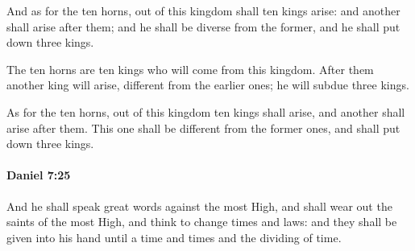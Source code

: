 			\begin{versebox}
					\item[BHS] 
					\item[LXX] 
					\item[ASV] And as for the ten horns, out of this kingdom shall ten kings arise: and another shall arise after them; and he shall be diverse from the former, and he shall put down three kings.
					\item[NIV] The ten horns are ten kings who will come from this kingdom. After them another king will arise, different from the earlier ones; he will subdue three kings.
					\item[NRSV] As for the ten horns, out of this kingdom ten kings shall arise, and another shall arise after them. This one shall be different from the former ones, and shall put down three kings.
			\end{versebox}

		\paragraph{Daniel 7:25} %
			\label{DANIEL-7-25}

			And he shall speak great words against the most High, and shall wear out the saints of the most High, and think to change times and laws: and they shall be given into his hand until a time and times and the dividing of time.

